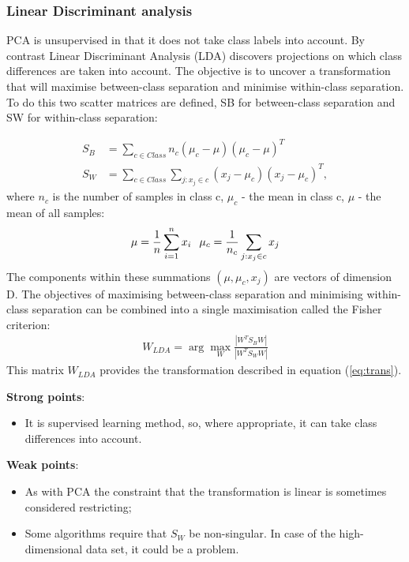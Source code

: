 \documentclass[a4paper]{article}
\begin{document}
\subsubsection{Linear Discriminant analysis}

PCA is unsupervised in that it does not take class labels into
account. By contrast Linear Discriminant Analysis (LDA)
discovers projections on which class differences are taken into
account. The objective is to uncover a transformation that will
maximise between-class separation and minimise within-class
separation. To do this two scatter matrices are defined, SB for
between-class separation and SW for within-class separation:

\begin{align*}
  S_B &= \sum_{c \in Class}n_c(\mu_c - \mu)(\mu_c - \mu)^T\\
  S_W &= \sum_{c \in Class}\sum_{j:x_j \in c}(x_j - \mu_c)(x_j - \mu_c)^T,
\end{align*}
where $n_c$ is the number of samples in class c, $\mu_c$ - the mean in
class c, $\mu$ - the mean of all samples:
\begin{align*}
 \mu = \frac{1}{n}\sum_{i=1}^nx_i \hspace{0.25cm}
 \mu_c=\frac{1}{n_c}\sum_{j:x_j \in c}x_j
\end{align*}
The components within these summations $(\mu, \mu_c, x_j)$ are vectors
of dimension D. The objectives of maximising between-class separation
and minimising within-class separation can be combined into a single maximisation called the Fisher criterion:
\begin{align*}
  W_{LDA} = \arg \max_W \frac{|W^TS_BW|}{|W^TS_WW|}
\end{align*}
This matrix $W_{LDA}$ provides the transformation described in
equation (\ref{eq:trans}).

\textbf{Strong points}:
\begin{itemize}
 \item It is supervised learning method, so, where appropriate, it can take class differences into account.
\end{itemize}

\textbf{Weak points}:
\begin{itemize}
 \item As with PCA the constraint that the transformation is linear is
   sometimes considered restricting;
 \item Some algorithms require that $S_W$ be non-singular. In case of
   the high-dimensional data set, it could be a problem.
\end{itemize}
\end{document}

